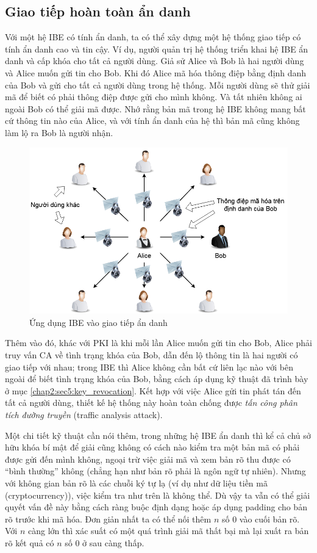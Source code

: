 \documentclass[class=report, crop=false]{standalone}
\begin{document}
		\subsection{Giao tiếp hoàn toàn ẩn danh}
			Với một hệ IBE có tính ẩn danh, ta có thể xây dựng một hệ thống giao tiếp có tính ẩn danh cao và tin cậy. Ví dụ, người quản trị hệ thống triển khai hệ IBE ẩn danh và cấp khóa cho tất cả người dùng. Giả sử Alice và Bob là hai người dùng và Alice muốn gửi tin cho Bob. Khi đó Alice mã hóa thông điệp bằng định danh của Bob và gửi cho tất cả người dùng trong hệ thống. Mỗi người dùng sẽ thử giải mã để biết có phải thông điệp được gửi cho mình không. Và tất nhiên không ai ngoài Bob có thể giải mã được. Nhớ rằng bản mã trong hệ IBE không mang bất cứ thông tin nào của Alice, và với tính ẩn danh của hệ thì bản mã cũng không làm lộ ra Bob là người nhận.
			\begin{figure}[h] 
				\captionsetup{font=normalsize}
				\includegraphics[width=\textwidth]{application_anonimous.png}
				\centering
				\caption{Ứng dụng IBE vào giao tiếp ẩn danh}
			\end{figure}
			
			Thêm vào đó, khác với PKI là khi mỗi lần Alice muốn gửi tin cho Bob, Alice phải truy vấn CA về tình trạng khóa của Bob, dẫn đến lộ thông tin là hai người có giao tiếp với nhau; trong IBE thì Alice không cần bất cứ liên lạc nào với bên ngoài để biết tình trạng khóa của Bob, bằng cách áp dụng kỹ thuật đã trình bày ở mục \ref{chap2:sec5:key_revocation}. Kết hợp với việc Alice gửi tin phát tán đến tất cả người dùng, thiết kế hệ thống này hoàn toàn chống được \textit{tấn công phân tích đường truyền} (traffic analysis attack).

			Một chi tiết kỹ thuật cần nói thêm, trong những hệ IBE ẩn danh thì kể cả chủ sở hữu khóa bí mật để giải cũng không có cách nào kiểm tra một bản mã có phải được gửi đến mình không, ngoại trừ việc giải mã và xem bản rõ thu được có ``bình thường'' không (chẳng hạn như bản rõ phải là ngôn ngữ tự nhiên). Nhưng với không gian bản rõ là các chuỗi ký tự lạ (ví dụ như dữ liệu tiền mã (cryptocurrency)), việc kiểm tra như trên là không thể. Dù vậy ta vẫn có thể giải quyết vấn đề này bằng cách ràng buộc định dạng hoặc áp dụng padding cho bản rõ trước khi mã hóa. Đơn giản nhất ta có thể nối thêm $n$ số 0 vào cuối bản rõ. Với $n$ càng lớn thì xác suất có một quá trình giải mã thất bại mà lại xuất ra bản rõ kết quả có $n$ số 0 ở sau càng thấp.
\end{document}
